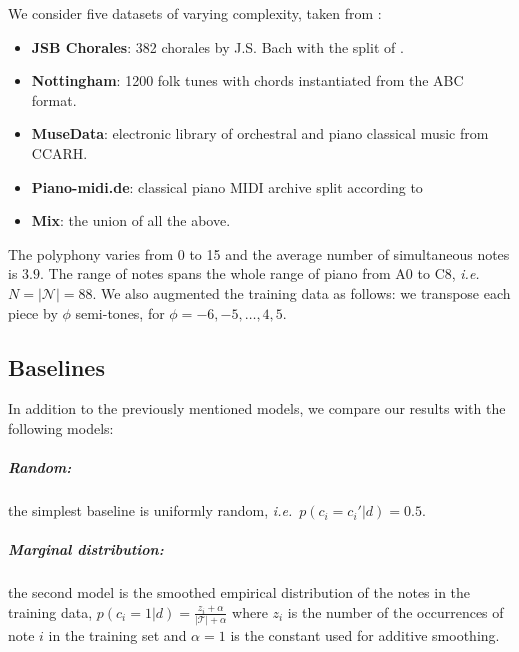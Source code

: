 \documentclass{article}
\newcommand{\N}{\mathcal{N}}
\newcommand{\T}{\mathcal{T}}
\newcommand{\ie}{\textit{i.e.}}
\begin{document}
We consider five datasets of varying complexity, taken from \cite{bl}:
\begin{itemize}
  \item \textbf{JSB Chorales}: 382 chorales by J.S. Bach with the split of  \citet{allan2005harmonising}.
 \item \textbf{Nottingham}: 1200 folk tunes with chords instantiated from the ABC format.
\item \textbf{MuseData}: electronic library of orchestral and piano classical music from CCARH.
\item \textbf{Piano-midi.de}: classical piano MIDI archive split according to \citet{poliner2007discriminative}
\item \textbf{Mix}: the union of all the above.
\end{itemize}
The polyphony varies from 0 to 15 and the average number of simultaneous notes is $3.9$. The range of notes spans the whole range of piano from A0 to C8, \ie\ $N = |\N| = 88$. We also augmented the training data as follows: we transpose each piece by $\phi$ semi-tones, for $\phi = -6, -5, \dots, 4, 5.$
%
\subsection{Baselines}
In addition to the previously mentioned models, we compare our results with the following models:
\subparagraph{Random:} the simplest baseline is uniformly random, \ie\ $p(c_i = c_i' | d ) = 0.5$.
\subparagraph{Marginal distribution:} the second model is the smoothed empirical distribution of the notes in the training data, $p(c_i = 1 | d )= \frac{z_i + \alpha}{|\T|+\alpha}$ where $z_i$ is the number of the occurrences of note $i$ in the training set and $\alpha = 1$ is the constant used for additive smoothing.
\end{document}
